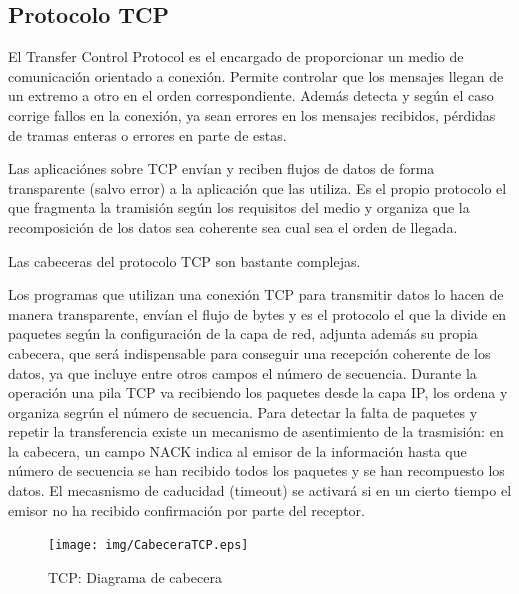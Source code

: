 \documentclass[a4paper,spanish,12pt]{book}
\begin{document}
\subsection{Protocolo TCP}
El Transfer Control Protocol es el encargado de proporcionar un medio de comunicación orientado a conexión. Permite controlar que los mensajes llegan de un extremo a otro en el orden correspondiente. Además detecta y según el caso corrige fallos en la conexión, ya sean errores en los mensajes recibidos, pérdidas de tramas enteras o errores en parte de estas.

Las aplicaciónes sobre TCP envían y reciben flujos de datos de forma transparente (salvo error) a la aplicación que las utiliza. Es el propio protocolo el que fragmenta la tramisión según los requisitos del medio y organiza que la recomposición de los datos sea coherente sea cual sea el orden de llegada.

Las cabeceras del protocolo TCP son bastante complejas.

Los programas que utilizan una conexión TCP para transmitir datos lo hacen de manera transparente, envían el flujo de bytes y es el protocolo el que la divide en paquetes según la configuración de la capa de red, adjunta además su propia cabecera, que será indispensable para conseguir una recepción coherente de los datos, ya que incluye entre otros campos el número de secuencia. Durante la operación una pila TCP va recibiendo los paquetes desde la capa IP, los ordena y organiza segrún el número de secuencia. Para detectar la falta de paquetes y repetir la transferencia existe un mecanismo de asentimiento de la trasmisión: en la cabecera, un campo NACK indica al emisor de la información hasta que número de secuencia se han recibido todos los paquetes y se han recompuesto los datos. El mecasnismo de caducidad (timeout) se activará si en un cierto tiempo el emisor no ha recibido confirmación por parte del receptor.
\begin{figure}[h]
	\begin{center}
	\texttt{[image: img/CabeceraTCP.eps]}	
\end{center}
\caption{TCP: Diagrama de cabecera}
  \label{fig:CabeceraTCP}
\end{figure}
\end{document}
